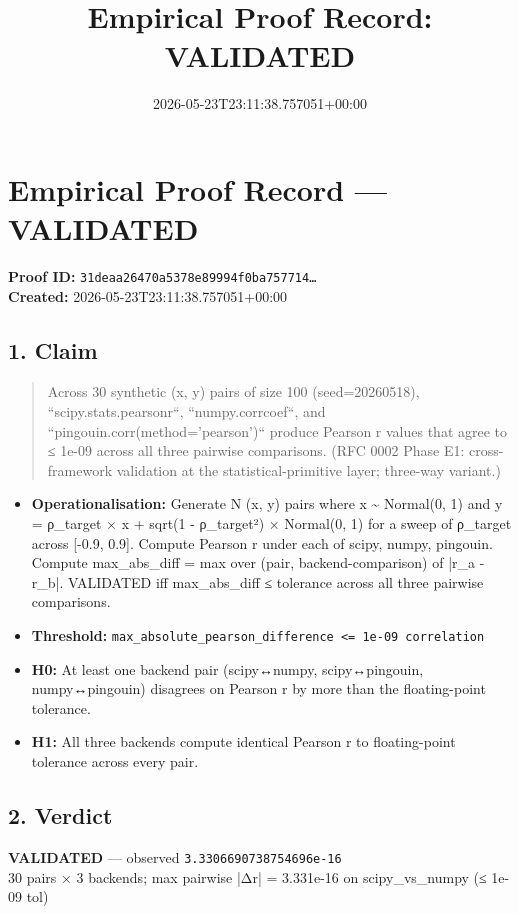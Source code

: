 \documentclass{article}
\title{Empirical Proof Record: VALIDATED}
\date{2026-05-23T23:11:38.757051+00:00}
\begin{document}
\maketitle
\section*{Empirical Proof Record --- \textcolor{validated}{\textbf{VALIDATED}}}
\textbf{Proof ID:} \texttt{31deaa26470a5378e89994f0ba757714\dots}\\
\textbf{Created:} 2026-05-23T23:11:38.757051+00:00
\subsection*{1. Claim}
\begin{quote}Across 30 synthetic (x, y) pairs of size 100 (seed=20260518), ``scipy.stats.pearsonr``, ``numpy.corrcoef``, and ``pingouin.corr(method='pearson')`` produce Pearson r values that agree to ≤ 1e-09 across all three pairwise comparisons. (RFC 0002 Phase E1: cross-framework validation at the statistical-primitive layer; three-way variant.)\end{quote}
\begin{itemize}
\item \textbf{Operationalisation:} Generate N (x, y) pairs where x \textasciitilde{} Normal(0, 1) and y = ρ\_target × x + sqrt(1 - ρ\_target²) × Normal(0, 1) for a sweep of ρ\_target across [-0.9, 0.9]. Compute Pearson r under each of scipy, numpy, pingouin. Compute max\_abs\_diff = max over (pair, backend-comparison) of |r\_a - r\_b|. VALIDATED iff max\_abs\_diff ≤ tolerance across all three pairwise comparisons.
\item \textbf{Threshold:} \texttt{max\_absolute\_pearson\_difference <= 1e-09 correlation}
\item \textbf{H0:} At least one backend pair (scipy↔numpy, scipy↔pingouin, numpy↔pingouin) disagrees on Pearson r by more than the floating-point tolerance.
\item \textbf{H1:} All three backends compute identical Pearson r to floating-point tolerance across every pair.
\end{itemize}
\subsection*{2. Verdict}
\textcolor{validated}{\textbf{VALIDATED}} --- observed \texttt{3.3306690738754696e-16}\\
30 pairs × 3 backends; max pairwise |Δr| = 3.331e-16 on scipy\_vs\_numpy (≤ 1e-09 tol)
\end{document}

